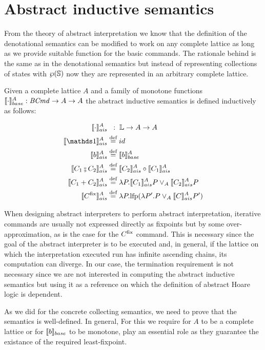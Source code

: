 \documentclass[
  10pt,       %
  twoside,    %
  a4paper,    %
  english,    %
  tikz,       %
  openright,  %
]{book}
\begin{document}
\section{Abstract inductive semantics}

From the theory of abstract interpretation we know that the definition of the
denotational semantics can be modified to work on any complete lattice as long
as we provide suitable function for the basic commands. The rationale
behind is the same as in the denotational semantics but instead of representing
collections of states with $\wp(\mathbb{S})$ now they are represented in an
arbitrary complete lattice.

\begin{definition}

  \label{def:abstract-inductive-semantics}
  Given a complete lattice $A$ and a family of monotone functions $\llbracket \cdot \rrbracket_{base}^A : 
  \mathit{BCmd} \to A \to A$ the abstract inductive semantics is defined inductively as 
  follows:

  \begin{align*}
      \asem{\cdot}         & \;\;:\; \lang \to A \to A \\
      \asem{\sskip}         &\defeq id \\
      \asem{b}             &\defeq \bsem{b}^A \\
      \asem{C_1 \fcmp C_2} &\defeq \asem{C_2} \circ \asem{C_1} \\
      \asem{C_1 + C_2}     &\defeq \lambda P . \asem{C_1} P \join_A \asem{C_2} P \\
      \asem{C^\fix}        &\defeq \lambda P . \lfp(\lambda P'. P \join_A \asem{C} P')
  \end{align*}
\end{definition}


When designing abstract interpreters to perform abstract interpretation,
iterative commands are usually not expressed directly as fixpoints but by
some over-approximation, as is the case for the $C^{\mathrm{fix}}$ command. This is
necessary since the goal of the abstract interpreter is to be executed and, in
general, if the lattice on which the interpretation executed run has infinite
ascending chains, its computation can diverge. In our case, the termination
requirement is not necessary since we are not interested in computing the abstract
inductive semantics but using it as a reference on which the definition of
abstract Hoare logic is dependent.


As we did for the concrete collecting semantics, we need to prove that the
semantics is well-defined. In general, For this we require for $A$
to be a complete lattice or for $\llbracket b \rrbracket_{base}$ to be monotone, play an essential role
as they guarantee the existance of the required least-fixpoint.
\end{document}
